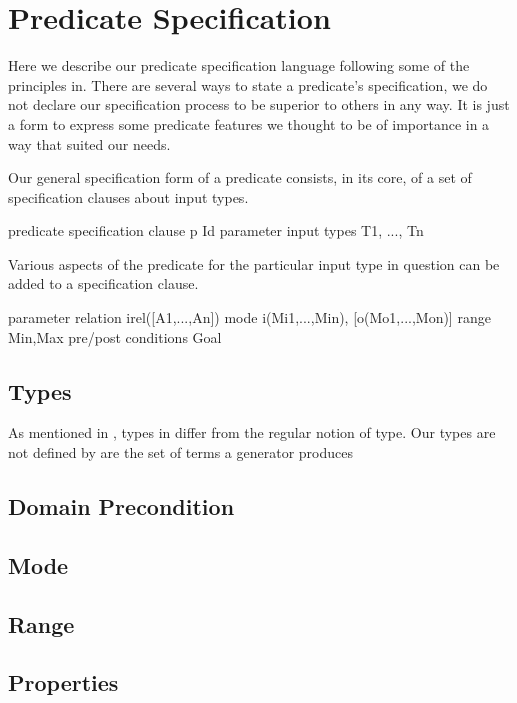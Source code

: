 
\section{Predicate Specification}
\label{sec:pred-spec}

Here we describe our predicate specification language following some of
the principles in.
%
There are several ways to state a predicate's specification, we do not
declare our specification process to be superior to others in any way.
%
It is just a form to express some predicate features we thought to be of
importance in a way that suited our needs.


Our general specification form of a predicate  consists, in its
core, of a set of specification clauses about input types.
%
\begin{code}
predicate specification clause
  p Id
parameter input types
  T1, ..., Tn
\end{code}
%
Various aspects of the predicate for the particular input type in
question can be added to a specification clause.
%
\begin{code}
parameter relation
  irel([A1,...,An])
mode
  i(Mi1,...,Min), [o(Mo1,...,Mon)]
range
  {Min,Max}
pre/post conditions
  Goal
\end{code}


\subsection{Types}

As mentioned in , types in \plqc{} differ from
the regular notion of type.
%
Our types are not defined by 
are the set of
terms a generator produces
\subsection{Domain Precondition}
\subsection{Mode}
\subsection{Range}
\subsection{Properties}

